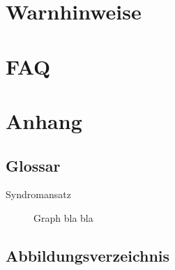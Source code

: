\documentclass[enabledeprecatedfontcommands,fontsize=11pt,paper=a4,twoside]{scrartcl}
\begin{document}
	
\section{Warnhinweise} \label{sec:warnhinweise}
	
	
	
	
\section{FAQ}
\newpage
\section{Anhang} \label{sec:anhang}	
	\subsection{Glossar}
	
	\begin{description}
		\item[Syndromansatz] Graph bla bla
	\end{description}
	
	\subsection{Abbildungsverzeichnis}
	\listoffigures
	

\newpage



\end{document}
